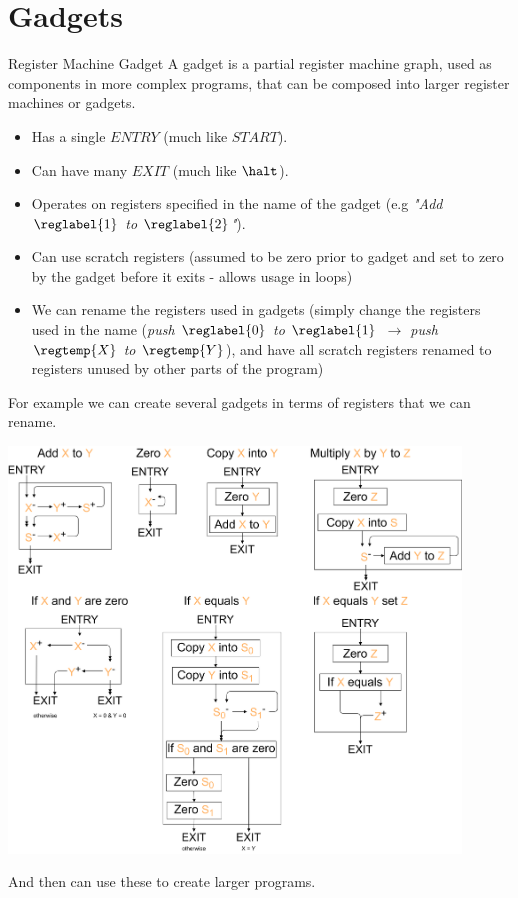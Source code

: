 \section{Gadgets}
\begin{definitionbox}{Register Machine Gadget}
	A gadget is a partial register machine graph, used as components in more complex programs, that can be composed into larger register machines or gadgets.
	\begin{itemize}
		\item Has a single $ENTRY$ (much like $START$).
		\item Can have many $EXIT$ (much like $\halt$).
		\item Operates on registers specified in the name of the gadget (e.g \textit{"Add $\reglabel{1}$ to $\reglabel{2}$"}).
		\item Can use scratch registers (assumed to be zero prior to gadget and set to zero by the gadget before it exits - allows usage in loops)
		\item We can rename the registers used in gadgets (simply change the registers used in the name (\textit{push $\reglabel{0}$ to $\reglabel{1}$ $\to$ push $\regtemp{X}$ to $\regtemp{Y}$}), and have all scratch registers renamed to registers unused by other parts of the program)
	\end{itemize}
	For example we can create several gadgets in terms of registers that we can rename.
	\begin{center}
		\includegraphics[width=0.9\textwidth]{register_machines/images/gadget.drawio.png}
	\end{center}
	And then can use these to create larger programs.
\end{definitionbox}

